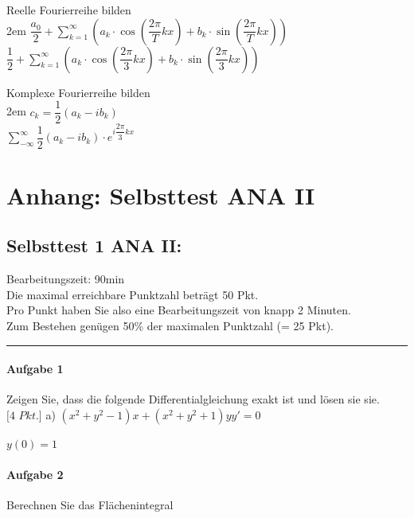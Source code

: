 \documentclass[11pt,final]{scrreprt}
\newcommand{\br} {\medskip\\}
\begin{document}
Reelle Fourierreihe bilden\\

\begingroup
\leftskip2em 
$ \dfrac{a_0}{2} + \sum\limits_{k=1}^{\infty} (a_k \cdot \cos(\dfrac{2\pi}{T} kx) + b_k \cdot \sin(\dfrac{2\pi}{T} kx)) $\\
$ \dfrac{1}{2} + \sum\limits_{k=1}^{\infty} (a_k \cdot \cos(\dfrac{2\pi}{3} kx) + b_k \cdot \sin(\dfrac{2\pi}{3} kx)) $\br
\par	
\endgroup 

Komplexe Fourierreihe bilden\\

\begingroup
\leftskip2em 
$ c_k = \dfrac{1}{2} (a_k - ib_k)$\\
$ \sum\limits_{-\infty}^{\infty} \dfrac{1}{2} (a_k - ib_k) \cdot e^{i\dfrac{2\pi}{3} kx} $\br
\par	
\endgroup 
	
\part{Anhang: Selbsttest ANA II}	

\chapter{Selbsttest 1 ANA II:}
Bearbeitungszeit: 90min\\
Die maximal erreichbare Punktzahl beträgt 50 Pkt.\\
Pro Punkt haben Sie also eine Bearbeitungszeit von knapp 2 Minuten.\\
Zum Bestehen genügen 50\% der maximalen Punktzahl (= 25 Pkt).\\
\hrule

\subsection*{Aufgabe 1}
Zeigen Sie, dass die folgende Differentialgleichung exakt ist und lösen sie sie.\\

$[4$ $Pkt.]$ a) $ (x^2 + y^2 - 1)x + (x^2 + y^2 + 1)y y' = 0$
\begin{center}
$ y(0) = 1 $
\end{center}
\subsection*{Aufgabe 2}

Berechnen Sie das Flächenintegral
\end{document}
